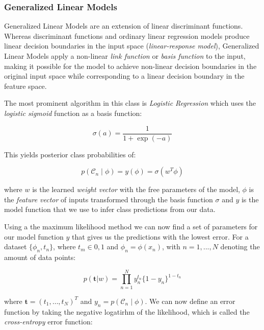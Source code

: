 \subsubsection{Generalized Linear Models}
\label{subs:Generalized Linear Modelsl}

Generalized Linear Models are an extension of linear discriminant functions. Whereas discriminant functions and ordinary linear regression models produce linear decision boundaries in the input space (\emph{linear-response model}), Generalized Linear Models apply a non-linear \emph{link function} or \emph{basis function} to the input, making it possible for the model to achieve non-linear decision boundaries in the original input space while corresponding to a linear decision boundary in the feature space.

The most prominent algorithm in this class is \emph{Logistic Regression} which uses the \emph{logistic sigmoid} function as a basis function:

\begin{equation}
  \sigma (a) = \frac{1}{1 + \exp(-a)}
  \label{eq:sigmoid}
\end{equation}

This yields posterior class probabilities of:

\begin{equation}
  p(\mathcal{C}_n \mid \phi) = y(\phi) = \sigma(w^T  \phi)
\end{equation}

where $w$ is the learned \emph{weight vector} with the free parameters of the model, $\phi$ is the \emph{feature vector} of inputs transformed through the basis function $\sigma$ and $y$ is the model function that we use to infer class predictions from our data.

Using a the maximum likelihood method we can now find a set of parameters for our model function $y$ that gives us the predictions with the lowest error. For a dataset $\{ \phi_n, t_n \}$, where $t_m \in {0, 1}$ and $\phi_n = \phi(x_n)$, with $n = 1, . . ., N$ denoting the amount of data points:

\begin{equation}
  p(\mathbf{t} | w) = \prod_{n=1}^N y_n^{t_n} \{ 1 - y_n \}^{1-t_n}
\end{equation}

where $\mathbf{t} = (t_1, \ldots, t_N)^T$ and $y_n = p(\mathcal{C}_n \mid \phi)$. We can now define an error function by taking the negative logatirhm of the likelihood, which is called the \emph{cross-entropy} error function:

